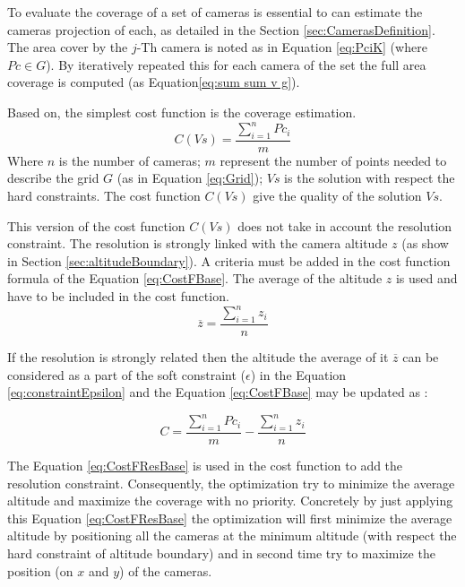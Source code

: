 To evaluate the coverage of a set of cameras is essential to can estimate the cameras projection of each, as detailed in the Section \ref{sec:CamerasDefinition}. The area cover by the $j$-Th camera is noted as in Equation \ref{eq:PciK} (where $Pc\in G$). By iteratively repeated this for each camera of the set the full area coverage is computed (as Equation\ref{eq:sum sum v g}). 

Based on, the simplest cost function is the coverage estimation.
\begin{equation}\label{eq:CostFBase}
C(Vs) =  \frac{\sum_{i=1}^n{Pc_i} }{m}   
\end{equation}
Where $n$ is the number of cameras; 
$m$ represent the number of points needed to describe the grid $G$ (as in Equation \ref{eq:Grid}); $Vs$ is the solution with respect the hard constraints.
The cost function $C(Vs)$ give the quality of the solution $Vs$.

This version of the cost function $C(Vs)$ does not take in account the resolution constraint. The resolution is  strongly linked with the camera altitude $z$ (as show in Section \ref{sec:altitudeBoundary}).
 A criteria must be added in the cost function formula of the Equation \ref{eq:CostFBase}. The average of the altitude $z$ is used and have to be included in the cost function.
 \begin{equation}\label{eq:CostFResolutionPart1}
\overline{z}= \frac{\sum_{i=1}^n z_i}{n}     
\end{equation}

 If the resolution is strongly related then the altitude the average of it $\overline{z}$ can be considered as a part of the soft constraint ($\epsilon$)  in the Equation \ref{eq:constraintEpsilon} and the Equation \ref{eq:CostFBase} may be updated as : 
 
 \begin{equation}\label{eq:CostFResBase}
C =  \frac{\sum_{i=1}^n {Pc_i}}{m}  - \frac{\sum_{i=1}^n z_i}{n}     
\end{equation}
 
The Equation \ref{eq:CostFResBase} is used in the cost function to add the resolution constraint. Consequently, the optimization  try to minimize the average altitude and maximize the coverage with no priority. Concretely by just applying this Equation  \ref{eq:CostFResBase} the optimization will first minimize the average altitude by positioning all the cameras at the minimum altitude (with respect the hard constraint of altitude boundary) and in second time try to maximize the position (on $x$ and $y$) of the cameras. 

